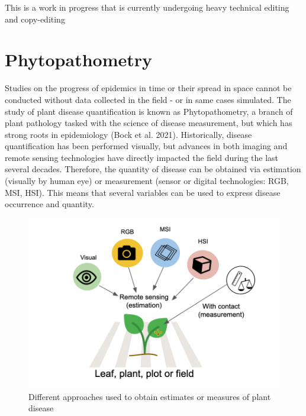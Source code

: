 \documentclass[
  letterpaper,
  DIV=11,
  numbers=noendperiod]{scrreprt}
\begin{document}
\begin{tcolorbox}[enhanced jigsaw, rightrule=.15mm, left=2mm, breakable, colframe=quarto-callout-note-color-frame, toprule=.15mm, leftrule=.75mm, bottomrule=.15mm, colback=white, arc=.35mm, opacityback=0]
\begin{minipage}[t]{5.5mm}
\textcolor{quarto-callout-note-color}{\faInfo}
\end{minipage}%
\begin{minipage}[t]{\textwidth - 5.5mm}
This is a work in progress that is currently undergoing heavy technical
editing and copy-editing\end{minipage}%
\end{tcolorbox}

\hypertarget{phytopathometry}{%
\section{Phytopathometry}\label{phytopathometry}}

Studies on the progress of epidemics in time or their spread in space
cannot be conducted without data collected in the field - or in same
cases simulated. The study of plant disease quantification is known as
Phytopathometry, a branch of plant pathology tasked with the science of
disease measurement, but which has strong roots in epidemiology (Bock et
al. 2021). Historically, disease quantification has been performed
visually, but advances in both imaging and remote sensing technologies
have directly impacted the field during the last several decades.
Therefore, the quantity of disease can be obtained via estimation
(visually by human eye) or measurement (sensor or digital technologies:
RGB, MSI, HSI). This means that several variables can be used to express
disease occurrence and quantity.

\begin{figure}

{\centering \includegraphics[width=5.10417in,height=\textheight]{./imgs/disease_measure.png}

}

\caption{Different approaches used to obtain estimates or measures of
plant disease}

\end{figure}
\end{document}
